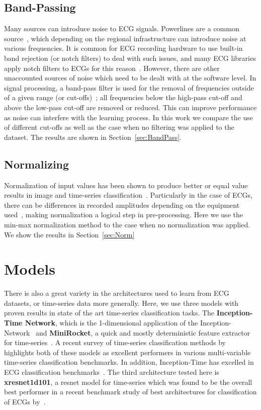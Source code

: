 \documentclass[pmlr,twocolumn]{jmlr}%
\begin{document}
\subsection{Band-Passing}
Many sources can introduce noise to ECG signals. Powerlines are a common source~\citep{uwaechia2021comprehensive}, which depending on the regional infrastructure can introduce noise at various frequencies. It is common for ECG recording hardware to use built-in band rejection (or notch filters) to deal with such issues, and many ECG libraries apply notch filters to ECGs for this reason~\citep{Makowski2021neurokit}. However, there are other unaccounted sources of noise which need to be dealt with at the software level. In signal processing, a band-pass filter is used for the removal of frequencies outside of a given range (or cut-offs)~\citep{lyons1997understanding}; all frequencies below the high-pass cut-off and above the low-pass cut-off are removed or reduced. This can improve performance as noise can interfere with the learning process. In this work we compare the use of different cut-offs as well as the case when no filtering was applied to the dataset. The results are shown in Section~\ref{sec:BandPass}. 

\subsection{Normalizing}
Normalization of input values has been shown to produce better or equal value results in image and time-series classification~\citep{bhanja2018impact}. Particularly in the case of ECGs, there can be differences in recorded amplitudes depending on the equipment used~\citep{uwaechia2021comprehensive}, making normalization a logical step in pre-processing. Here we use the min-max normalization method to the case when no normalization was applied. We show the results in Section~\ref{sec:Norm}

\section{Models}
There is also a great variety in the architectures used to learn from ECG datasets, or time-series data more generally. Here, we use three models with proven results in state of the art time-series classification tasks. The \textbf{Inception-Time Network}, which is the 1-dimensional application of the Inception-Network~\citep{szegedy2017inception,ismail2020inceptiontime} and \textbf{MiniRocket}, a quick and mostly deterministic feature extractor for time-series~\citep{dempster2021minirocket}. A recent survey of time-series classification methods by~\cite{ruiz2021great} highlights both of these models as excellent performers in various multi-variable time-series classification benchmarks. In addition, Inception-Time has excelled in ECG classification benchmarks~\citep{Strodthoff2021}. The third architecture tested here is \textbf{xresnet1d101}, a resnet model for time-series which was found to be the overall best performer in a recent benchmark study of best architectures for classification of ECGs by~\citet{strodthoff2020deep}.
\end{document}
